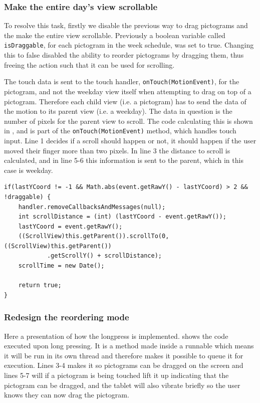 \subsubsection{Make the entire day's view scrollable}
To resolve this task, firstly we disable the previous way to drag pictograms and the make the entire view scrollable.
Previously a boolean variable called \texttt{isDraggable}, for each pictogram in the week schedule, was set to true.
Changing this to false disabled the ability to reorder pictograms by dragging them, thus freeing the action such that it can be used for scrolling.

The touch data is sent to the touch handler, \texttt{onTouch(MotionEvent)}, for the pictogram, and not the weekday view itself when attempting to drag on top of a pictogram.
Therefore each child view (i.e. a pictogram) has to send the data of the motion to its parent view (i.e. a weekday).
The data in question is the number of pixels for the parent view to scroll.
The code calculating this is shown in , and is part of the \texttt{onTouch(MotionEvent)} method, which handles touch input.
Line 1 decides if a scroll should happen or not, it should happen if the user moved their finger more than two pixels.
In line 3 the distance to scroll is calculated, and in line 5-6 this information is sent to the parent, which in this case is weekday.

\begin{lstlisting}[float, floatplacement=h, caption={The code executed when someone performs a move action.}, label={lst:actionmove}]
if(lastYCoord != -1 && Math.abs(event.getRawY() - lastYCoord) > 2 && !draggable) {
    handler.removeCallbacksAndMessages(null);
    int scrollDistance = (int) (lastYCoord - event.getRawY());
    lastYCoord = event.getRawY();
    ((ScrollView)this.getParent()).scrollTo(0, ((ScrollView)this.getParent())
            .getScrollY() + scrollDistance);
    scrollTime = new Date();

    return true;
}
\end{lstlisting}

\subsubsection{Redesign the reordering mode}
Here a presentation of how the longpress is implemented.
 shows the code executed upon long pressing.
It is a method made inside a runnable which means it will be run in its own thread and therefore makes it possible to queue it for execution.
Lines 3-4 makes it so pictograms can be dragged on the screen and lines 5-7 will if a pictogram is being touched lift it up indicating that the pictogram can be dragged, and the tablet will also vibrate briefly so the user knows they can now drag the pictogram.

